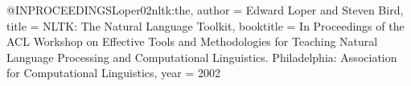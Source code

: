 @INPROCEEDINGS{Loper02nltk:the,
    author = {Edward Loper and Steven Bird},
    title = {NLTK: The Natural Language Toolkit},
    booktitle = {In Proceedings of the ACL Workshop on Effective Tools and Methodologies for Teaching Natural Language Processing and Computational Linguistics. Philadelphia: Association for Computational Linguistics},
    year = {2002}
}